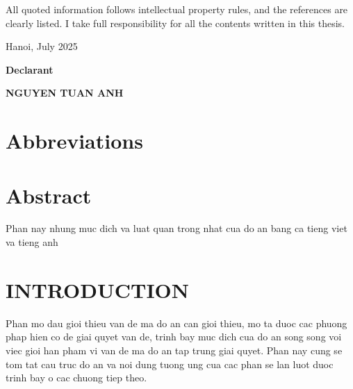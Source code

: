 \documentclass{article}
\renewcommand{\figurename}{\fontsize{12pt}{0pt}\selectfont \bfseries Figure}
\renewcommand{\tablename}{\fontsize{12pt}{0pt}\selectfont \bfseries Table}
\begin{document}
All quoted information follows intellectual property rules, and the references are clearly listed. I take full responsibility for all the contents written in this thesis.

\vspace{6pt}
\hspace{9.2cm} Hanoi, July 2025

\hspace{10cm} \textbf{Declarant}

\vspace{2cm}
\hspace{8.65cm} \textbf{NGUYEN TUAN ANH}
\cleardoublepage

\tableofcontents
\thispagestyle{empty}
\cleardoublepage

\section*{Abbreviations}
 {}
\cleardoublepage

{
\let\oldnumberline\numberline
\renewcommand{\numberline}{\figurename~\oldnumberline}
\listoffigures
}
 {}
\cleardoublepage

{
\let\oldnumberline\numberline
\renewcommand{\numberline}{\tablename~\oldnumberline}
\listoftables
}
 {}
\cleardoublepage

\section*{Abstract}
Phan nay nhung muc dich va luat quan trong nhat cua do an bang ca tieng viet va tieng anh
\cleardoublepage

\section*{INTRODUCTION}
 {}
Phan mo dau gioi thieu van de ma do an can gioi thieu, mo ta duoc cac phuong phap hien co de giai quyet van de, trinh bay muc dich cua do an song song voi viec gioi han pham vi van de ma do an tap trung giai quyet. Phan nay cung se tom tat cau truc do an va noi dung tuong ung cua cac phan se lan luot duoc trinh bay o cac chuong tiep theo.
\end{document}
